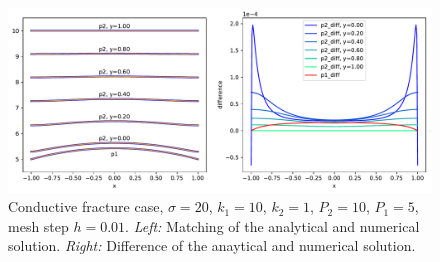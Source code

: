 \documentclass[a4paper,10pt]{article}
\begin{document}
\begin{figure}
  \label{fig:barrier_solution}
  \centering
  \includegraphics[width=\textwidth, keepaspectratio=true]{./continuous_solution.pdf}
  \caption{Conductive fracture case, $\sigma=20$, $k_1=10$, $k_2=1$, $P_2=10$, $P_1=5$, mesh step $h=0.01$. 
  {\it Left:} Matching of the analytical and numerical solution. 
  {\it Right:} Difference of the anaytical and numerical solution.}
\end{figure}
\end{document}
